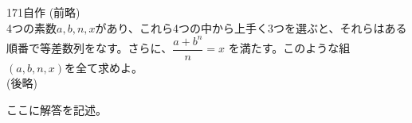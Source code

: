 \begin{thm}{171}{}{自作}
 (前略) \\
 4つの素数$a, b, n, x$があり、これら4つの中から上手く3つを選ぶと、それらはある順番で等差数列をなす。さらに、$\dfrac{a+b^n}{n}=x$ を満たす。このような組$(a, b, n, x)$を全て求めよ。 \\
 (後略)
\end{thm}

ここに解答を記述。